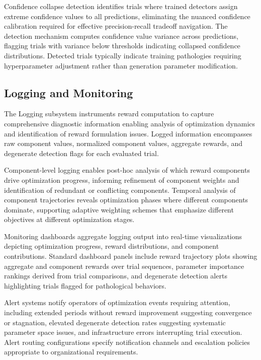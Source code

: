 Confidence collapse detection identifies trials where trained detectors assign extreme confidence values to all predictions, eliminating the nuanced confidence calibration required for effective precision-recall tradeoff navigation. The detection mechanism computes confidence value variance across predictions, flagging trials with variance below thresholds indicating collapsed confidence distributions. Detected trials typically indicate training pathologies requiring hyperparameter adjustment rather than generation parameter modification.

\subsection{Logging and Monitoring}

The Logging subsystem instruments reward computation to capture comprehensive diagnostic information enabling analysis of optimization dynamics and identification of reward formulation issues. Logged information encompasses raw component values, normalized component values, aggregate rewards, and degenerate detection flags for each evaluated trial.

Component-level logging enables post-hoc analysis of which reward components drive optimization progress, informing refinement of component weights and identification of redundant or conflicting components. Temporal analysis of component trajectories reveals optimization phases where different components dominate, supporting adaptive weighting schemes that emphasize different objectives at different optimization stages.

Monitoring dashboards aggregate logging output into real-time visualizations depicting optimization progress, reward distributions, and component contributions. Standard dashboard panels include reward trajectory plots showing aggregate and component rewards over trial sequences, parameter importance rankings derived from trial comparisons, and degenerate detection alerts highlighting trials flagged for pathological behaviors.

Alert systems notify operators of optimization events requiring attention, including extended periods without reward improvement suggesting convergence or stagnation, elevated degenerate detection rates suggesting systematic parameter space issues, and infrastructure errors interrupting trial execution. Alert routing configurations specify notification channels and escalation policies appropriate to organizational requirements.

